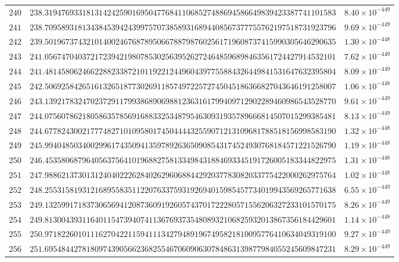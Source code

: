 \documentclass[12pt,reqno]{amsart}
\theoremstyle{remark}
\begin{document}
\begin{longtable}{clc}
$240$ & $238.3194769331813142425901695047768411068527488694586649839423387741101583$ & $8.40\times 10^{-449}$ \\
$241$ & $238.7095893181343845394243997570738589316894408567377755762197518731923796$ & $9.69\times 10^{-449}$ \\
$242$ & $239.5019673743210140024676878950667887987602561719608737415990305646290635$ & $1.30\times 10^{-448}$ \\
$243$ & $241.0567470403721723942198078530256395262724648596898463561724427914532101$ & $7.62\times 10^{-449}$ \\
$244$ & $241.4814580624662288233872101192212449604397755884326449841531647632395804$ & $8.09\times 10^{-449}$ \\
$245$ & $242.5069258426516132651877302691185749722572745045186366827043646191258007$ & $1.06\times 10^{-448}$ \\
$246$ & $243.1392178324702372911799386890698812363161799409712902289460986543528770$ & $9.61\times 10^{-449}$ \\
$247$ & $244.0756078621805863578569168833253487954630931935789666814507015299385481$ & $8.13\times 10^{-449}$ \\
$248$ & $244.6778243002177748271010958017450444432559071213109681788518156998583190$ & $1.32\times 10^{-448}$ \\
$249$ & $245.9940485034002996174350941359789263650908543174524930768184571221526790$ & $1.19\times 10^{-448}$ \\
$250$ & $246.4535806879640563756410196882758133498431884693345191726005183344822975$ & $1.31\times 10^{-448}$ \\
$251$ & $247.9886213730131240402226284026296068844292037783082033775422000262975764$ & $1.02\times 10^{-448}$ \\
$252$ & $248.2553158193121689558351122076337593192694015985457734019943569265771638$ & $6.55\times 10^{-449}$ \\
$253$ & $249.1325991718373065694120873609192605743701722280571556206327233101570175$ & $8.26\times 10^{-449}$ \\
$254$ & $249.8130043931164011547394074113676937354808932106825932013867356184429601$ & $1.14\times 10^{-448}$ \\
$255$ & $250.9718226010111627042211594111342794891967495821810095776410634049319100$ & $9.27\times 10^{-449}$ \\
$256$ & $251.6954844278180974390566236825546706090630784863139877984055245609847231$ & $8.29\times 10^{-449}$ \\

\end{longtable}
\end{document}
